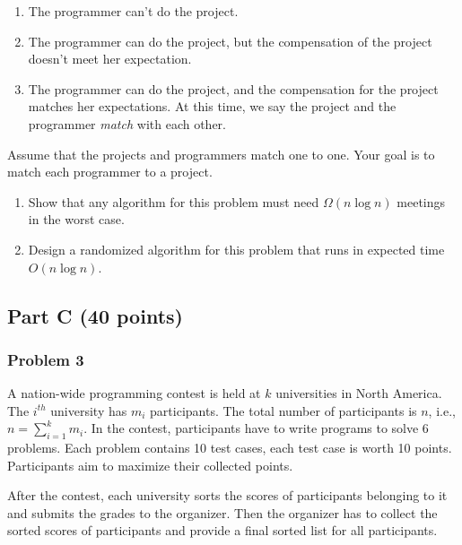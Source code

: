 \documentclass[11pt]{article}
\begin{document}
\begin{enumerate}
  \item The programmer can't do the project.
  \item The programmer can do the project, but the compensation of the
    project doesn't meet her expectation.
  \item The programmer can do the project, and the compensation for
    the project matches her expectations. At this time, we say the
    project and the programmer \textit{match} with each other.
\end{enumerate}

Assume that the projects and programmers match one to one. Your goal
is to match each programmer to a project.

\begin{enumerate}[label=\Alph*.]
\item Show that any algorithm for this problem must need $\Omega( n
\log{n} )$ meetings in the worst case.

\item  Design a randomized algorithm for this problem that runs in
expected time $O ( n \log{n} )$.
\end{enumerate}

\subsection*{Part C (40 points)}

\subsubsection*{Problem 3} 

A nation-wide programming contest is held
at $k$ universities in North America. The $i^{th}$ university has
$m_{i}$ participants. The total number of participants is $n$, i.e.,
$n = \sum_{i=1}^{k}m_{i}$. In the contest, participants have to write
programs to solve 6 problems. Each problem contains 10 test cases,
each test case is worth 10 points. Participants aim to maximize their
collected points.  

After the contest, each university sorts the scores of participants
belonging to it and submits the grades to the organizer.  Then the
organizer has to collect the sorted scores of participants and provide
a final sorted list for all participants.
\end{document}
